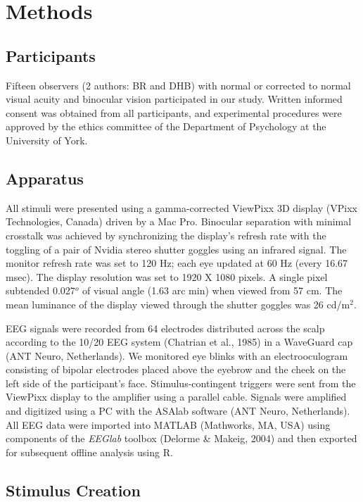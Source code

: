 \documentclass[
  12pt,
]{article}
\begin{document}
\section{Methods}\label{methods}

\subsection{Participants}\label{participants}

Fifteen observers (2 authors: BR and DHB) with normal or corrected to
normal visual acuity and binocular vision participated in our study.
Written informed consent was obtained from all participants, and
experimental procedures were approved by the ethics committee of the
Department of Psychology at the University of York.

\subsection{Apparatus}\label{apparatus}

All stimuli were presented using a gamma-corrected ViewPixx 3D display
(VPixx Technologies, Canada) driven by a Mac Pro. Binocular separation
with minimal crosstalk was achieved by synchronizing the display's
refresh rate with the toggling of a pair of Nvidia stereo shutter
goggles using an infrared signal. The monitor refresh rate was set to
120 Hz; each eye updated at 60 Hz (every 16.67 msec). The display
resolution was set to 1920 X 1080 pixels. A single pixel subtended
0.027\(^o\) of visual angle (1.63 arc min) when viewed from 57 cm. The
mean luminance of the display viewed through the shutter goggles was 26
cd/m\(^2\).

EEG signals were recorded from 64 electrodes distributed across the
scalp according to the 10/20 EEG system (Chatrian et al., 1985) in a
WaveGuard cap (ANT Neuro, Netherlands). We monitored eye blinks with an
electrooculogram consisting of bipolar electrodes placed above the
eyebrow and the cheek on the left side of the participant's face.
Stimulus-contingent triggers were sent from the ViewPixx display to the
amplifier using a parallel cable. Signals were amplified and digitized
using a PC with the ASAlab software (ANT Neuro, Netherlands). All EEG
data were imported into MATLAB (Mathworks, MA, USA) using components of
the \textit{EEGlab} toolbox (Delorme \& Makeig, 2004) and then exported
for subsequent offline analysis using R.

\subsection{Stimulus Creation}\label{stimulus-creation}
\end{document}
